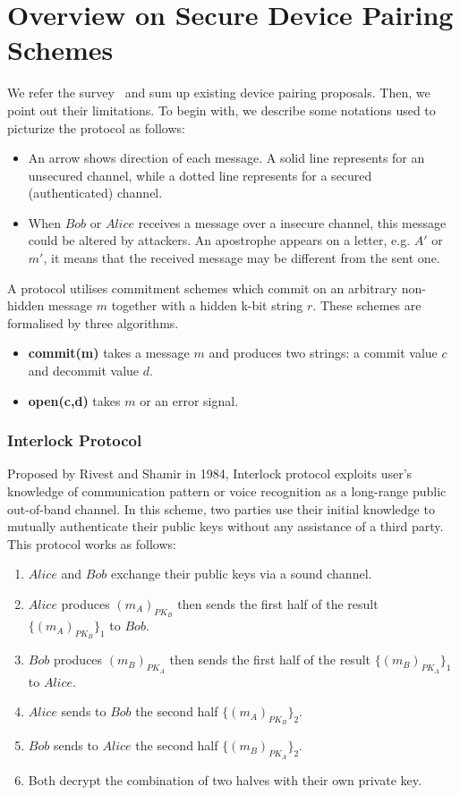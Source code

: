 \section{Overview on Secure Device Pairing Schemes}

We refer the survey~\cite{6687314} and sum up existing device pairing proposals. Then, we point out their limitations. To begin with, we describe some notations used to picturize the protocol as follows:

\begin{itemize}
\item An arrow shows direction of each message. A solid line represents for an unsecured channel, while a dotted line represents for a secured (authenticated) channel. 
\item When $Bob$ or $Alice$ receives a message over a insecure channel, this message could be altered by attackers. An apostrophe appears on a letter, e.g. $A'$ or $m'$, it means that the received message may be different from the sent one. 
\end{itemize}

A protocol utilises commitment schemes which commit on an arbitrary non-hidden message $m$ together with a hidden k-bit string $r$. These schemes are formalised by three algorithms.

\begin{itemize}
\item \textbf{commit(m)} takes a message $m$ and produces two strings: a commit value $c$ and decommit value $d$. 
\item \textbf{open(c,d)} takes $m$ or  an error signal. 
\end{itemize} 

\subsubsection{Interlock Protocol}

Proposed by Rivest and Shamir in 1984, Interlock protocol exploits user's knowledge of communication pattern or voice recognition as a long-range public out-of-band channel. In this scheme, two parties use their initial knowledge to mutually authenticate their public keys without any assistance of a third party. This protocol works as follows:
\begin{enumerate}
\item $Alice$ and $Bob$ exchange their public keys via a sound channel. 
\item $Alice$ produces $(m_A)_{PK_B}$ then sends the first half of the result  $\{(m_A)_{PK_B}\}_1$ to $Bob$. 
\item $Bob$ produces $(m_B)_{PK_A}$ then sends the first half of the result $\{(m_B)_{PK_A}\}_1$ to $Alice$. 
\item $Alice$ sends to $Bob$ the second half $\{(m_A)_{PK_B}\}_2$. 
\item $Bob$ sends to $Alice$ the second half $\{(m_B)_{PK_A}\}_2$. 
\item Both decrypt the combination of two halves with their own private key. 
\end{enumerate}   

